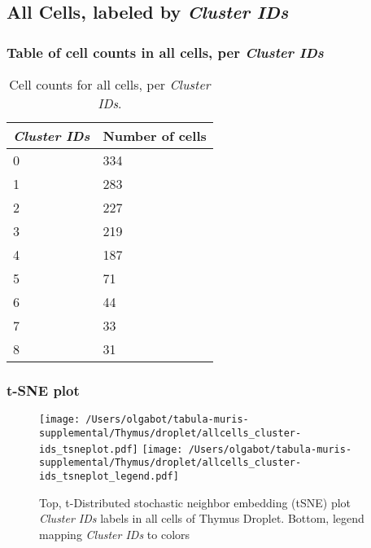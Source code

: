 \clearpage

\subsection{All Cells, labeled by \emph{Cluster IDs}}
\subsubsection{Table of cell counts in all cells, per \emph{Cluster IDs}}\begin{table}[h]
\centering
\label{my-label}
\begin{tabular}{@{}ll@{}}
\toprule

\emph{Cluster IDs}& Number of cells \\ \midrule
0 & 334 \\

1 & 283 \\

2 & 227 \\

3 & 219 \\

4 & 187 \\

5 & 71 \\

6 & 44 \\

7 & 33 \\

8 & 31 \\
\bottomrule
\end{tabular}
\caption{Cell counts for all cells, per \emph{Cluster IDs}.}
\end{table}

\clearpage
\subsubsection{t-SNE plot}
\begin{figure}[h]
\centering
\texttt{[image: /Users/olgabot/tabula-muris-supplemental/Thymus/droplet/allcells\_cluster-ids\_tsneplot.pdf]}
\texttt{[image: /Users/olgabot/tabula-muris-supplemental/Thymus/droplet/allcells\_cluster-ids\_tsneplot\_legend.pdf]}
\caption{Top, t-Distributed stochastic neighbor embedding (tSNE) plot  \emph{Cluster IDs} labels in all cells of Thymus Droplet. Bottom, legend mapping \emph{Cluster IDs} to colors}
\end{figure}


